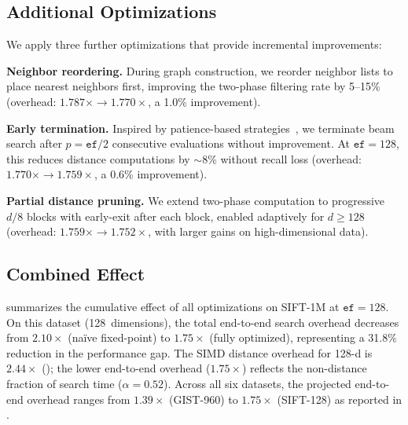 \documentclass[10pt,journal]{IEEEtran}
\begin{document}
\subsection{Additional Optimizations}

We apply three further optimizations that provide incremental improvements:

\textbf{Neighbor reordering.} During graph construction, we reorder neighbor lists to place nearest neighbors first, improving the two-phase filtering rate by 5--15\% (overhead: $1.787\times \to 1.770\times$, a 1.0\% improvement).

\textbf{Early termination.} Inspired by patience-based strategies~\cite{teofili2025patience}, we terminate beam search after $p = \texttt{ef}/2$ consecutive evaluations without improvement. At $\texttt{ef}=128$, this reduces distance computations by $\sim$8\% without recall loss (overhead: $1.770\times \to 1.759\times$, a 0.6\% improvement).

\textbf{Partial distance pruning.} We extend two-phase computation to progressive $d/8$ blocks with early-exit after each block, enabled adaptively for $d \geq 128$ (overhead: $1.759\times \to 1.752\times$, with larger gains on high-dimensional data).

\subsection{Combined Effect}

 summarizes the cumulative effect of all optimizations on SIFT-1M at $\texttt{ef} = 128$. On this dataset (128~dimensions), the total end-to-end search overhead decreases from $2.10\times$ (na\"ive fixed-point) to $1.75\times$ (fully optimized), representing a 31.8\% reduction in the performance gap. The SIMD distance overhead for 128-d is $2.44\times$ (); the lower end-to-end overhead ($1.75\times$) reflects the non-distance fraction of search time ($\alpha{=}0.52$). Across all six datasets, the projected end-to-end overhead ranges from $1.39\times$ (GIST-960) to $1.75\times$ (SIFT-128) as reported in .
\end{document}
